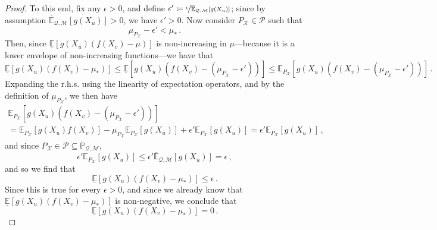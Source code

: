 \documentclass[3p]{elsarticle}
\newcommand{\states}{\mathcal{X}}
\newcommand{\uexp}{\overline{\mathbb{E}}_{\rateset,\mathcal{M}}}
\newcommand{\rateset}{\mathcal{Q}}
\newcommand{\coloneqq}{:\!=}
\begin{document}
\begin{proof}
To this end, fix any $\epsilon>0$, and define $\epsilon'\coloneqq \nicefrac{\epsilon}{\uexp[g(X_u)]}$; since by assumption $\uexp[g(X_u)]>0$, we have $\epsilon' >0$. Now consider ${P_\states}\in\mathcal{P}$ such that
\begin{equation*}
\mu_{P_\states} - \epsilon' < \mu_*\,.
\end{equation*}
Then, since $\underline{\mathbb{E}}[g(X_u)(f(X_v) - \mu)]$ is non-increasing in $\mu$---because it is a lower envelope of non-increasing functions---we have that
\begin{equation*}
\underline{\mathbb{E}}[g(X_u)(f(X_v) - \mu_*)] \leq \underline{\mathbb{E}}[g(X_u)(f(X_v) - (\mu_{P_\states} - \epsilon'))]\leq \mathbb{E}_{P_\states}[g(X_u)(f(X_v) - (\mu_{P_\states} - \epsilon'))]\,.
\end{equation*}
Expanding the r.h.s. using the linearity of expectation operators, and by the definition of $\mu_{P_\states}$, we then have
\begin{multline*}
\mathbb{E}_{P_\states}[g(X_u)(f(X_v) - (\mu_{P_\states} - \epsilon'))]\\ = \mathbb{E}_{P_\states}[g(X_u)f(X_v)] - \mu_{P_\states}\mathbb{E}_{P_\states}[g(X_u)] + \epsilon'\mathbb{E}_{P_\states}[g(X_u)] = \epsilon'\mathbb{E}_{P_\states}[g(X_u)]\,,
\end{multline*}
and since ${P_\states}\in\mathcal{P}\subseteq\mathbb{P}_{\rateset,\mathcal{M}}$,
\begin{equation*}
\epsilon'\mathbb{E}_{P_\states}[g(X_u)] \leq \epsilon'\uexp[g(X_u)]=\epsilon\,,
\end{equation*}
and so we find that
\begin{equation*}
\underline{\mathbb{E}}[g(X_u)(f(X_v) - \mu_*)] \leq \epsilon\,.
\end{equation*}
Since this is true for every $\epsilon>0$, and since we already know that $\underline{\mathbb{E}}[g(X_u)(f(X_v) - \mu_*)]$ is non-negative, we conclude that
\begin{equation*}
\underline{\mathbb{E}}[g(X_u)(f(X_v) - \mu_*)] = 0\,.
\end{equation*}


\end{proof}
\end{document}
